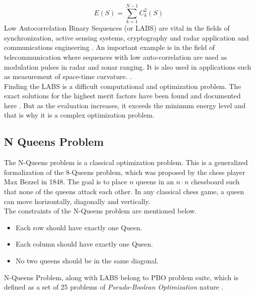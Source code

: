 \documentclass{article}
\begin{document}
\begin{equation*}
    E(S) = \sum_{k=1}^{N-1}C_k^2(S)
\end{equation*}
Low Autocorrelation Binary Sequences (or LABS) are vital in the fields of  synchronization, active sensing systems, cryptography and radar application and communications engineering \cite{LABS_Explanation}. An important example is in the field of telecommunication where sequences with low auto-correlation are used as modulation pulses in radar and sonar ranging. It is also used in applications such as measurement of space-time curvature. \cite{Packebusch_2016}.\\
Finding the LABS is a difficult computational and optimization problem. The exact solutions for the highest merit factors have been found and documented here \cite{Ukil_2010}. But as the evaluation increases, it exceeds the minimum energy level and that is why it is a complex optimization problem.\\

\subsection{N Queens Problem}\label{sec:nqueens}
The N-Queens problem is a classical optimization problem. This is a generalized formalization of the 8-Queens problem, which was proposed by the chess player Max Bezzel in 1848. The goal is to place $n$ queens in an $n \cdot n$ chessboard such that none of the queens attack each other. In any classical chess game, a queen can move horizontally, diagonally and vertically. \\ 
The constraints of the N-Queens problem are mentioned below.  \cite{n_queens}
\begin{itemize}
    \item Each row should have exactly one Queen. 
    \item Each column should have exactly one Queen.
    \item No two queens should be in the same diagonal.
\end{itemize}
N-Queens Problem, along with LABS belong to PBO problem suite, which is defined as a set of 25 problems of  \textit{Pseudo-Boolean Optimization} nature \cite{IOHprofiler}. 
\end{document}
